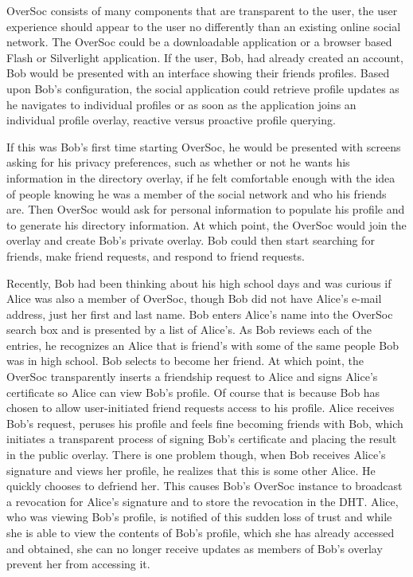 \documentclass{sig-alternate}
\begin{document}
OverSoc consists of many components that are transparent to the user, the user
experience should appear to the user no differently than an existing online
social network.  The OverSoc could be a downloadable application or a browser
based Flash or Silverlight application.  If the user, Bob, had already created
an account, Bob would be presented with an interface showing their friends
profiles.  Based upon Bob's configuration, the social application could
retrieve profile updates as he navigates to individual profiles or as soon as
the application joins an individual profile overlay, reactive versus proactive
profile querying.  

If this was Bob's first time starting OverSoc, he would be presented with
screens asking for his privacy preferences, such as whether or not he wants his
information in the directory overlay, if he felt comfortable enough with the
idea of people knowing he was a member of the social network and who his
friends are.  Then OverSoc would ask for personal information to populate his
profile and to generate his directory information.  At which point, the OverSoc
would join the overlay and create Bob's private overlay.  Bob could then start
searching for friends, make friend requests, and respond to friend requests.

Recently, Bob had been thinking about his high school days and was curious if
Alice was also a member of OverSoc, though Bob did not have Alice's e-mail
address, just her first and last name.  Bob enters Alice's name into the
OverSoc search box and is presented by a list of Alice's.  As Bob reviews each
of the entries, he recognizes an Alice that is friend's with some of the same
people Bob was in high school.  Bob selects to become her friend.  At which
point, the OverSoc transparently inserts a friendship request to Alice and
signs Alice's certificate so Alice can view Bob's profile.  Of course that is
because Bob has chosen to allow user-initiated friend requests access to his
profile.  Alice receives Bob's request, peruses his profile and feels fine
becoming friends with Bob, which initiates a transparent process of signing
Bob's certificate and placing the result in the public overlay.  There is one
problem though, when Bob receives Alice's signature and views her profile, he
realizes that this is some other Alice.  He quickly chooses to defriend her.
This causes Bob's OverSoc instance to broadcast a revocation for Alice's
signature and to store the revocation in the DHT.  Alice, who was viewing Bob's
profile, is notified of this sudden loss of trust and while she is able to view
the contents of Bob's profile, which she has already accessed and obtained, she
can no longer receive updates as members of Bob's overlay prevent her from
accessing it.
\end{document}
